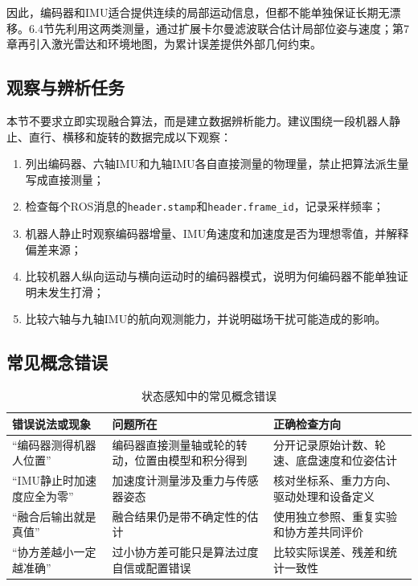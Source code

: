 \documentclass[UTF8,zihao=-4]{ctexart}
\begin{document}
因此，编码器和IMU适合提供连续的局部运动信息，但都不能单独保证长期无漂移。6.4节先利用这两类测量，通过扩展卡尔曼滤波联合估计局部位姿与速度；第7章再引入激光雷达和环境地图，为累计误差提供外部几何约束。

\subsection*{观察与辨析任务}

本节不要求立即实现融合算法，而是建立数据辨析能力。建议围绕一段机器人静止、直行、横移和旋转的数据完成以下观察：
\begin{enumerate}
  \item 列出编码器、六轴IMU和九轴IMU各自直接测量的物理量，禁止把算法派生量写成直接测量；
  \item 检查每个ROS消息的\texttt{header.stamp}和\texttt{header.frame\_id}，记录采样频率；
  \item 机器人静止时观察编码器增量、IMU角速度和加速度是否为理想零值，并解释偏差来源；
  \item 比较机器人纵向运动与横向运动时的编码器模式，说明为何编码器不能单独证明未发生打滑；
  \item 比较六轴与九轴IMU的航向观测能力，并说明磁场干扰可能造成的影响。
\end{enumerate}

\subsection*{常见概念错误}

\begin{table}[htbp]
  \centering
  \caption{状态感知中的常见概念错误}
  \begin{tabular}{p{}p{}p{}}
    \toprule
    错误说法或现象 & 问题所在 & 正确检查方向 \\
    \midrule
    “编码器测得机器人位置” & 编码器直接测量轴或轮的转动，位置由模型和积分得到 & 分开记录原始计数、轮速、底盘速度和位姿估计 \\
    “IMU静止时加速度应全为零” & 加速度计测量涉及重力与传感器姿态 & 核对坐标系、重力方向、驱动处理和设备定义 \\
    “融合后输出就是真值” & 融合结果仍是带不确定性的估计 & 使用独立参照、重复实验和协方差共同评价 \\
    “协方差越小一定越准确” & 过小协方差可能只是算法过度自信或配置错误 & 比较实际误差、残差和统计一致性 \\
    \bottomrule
  \end{tabular}
\end{table}
\end{document}

